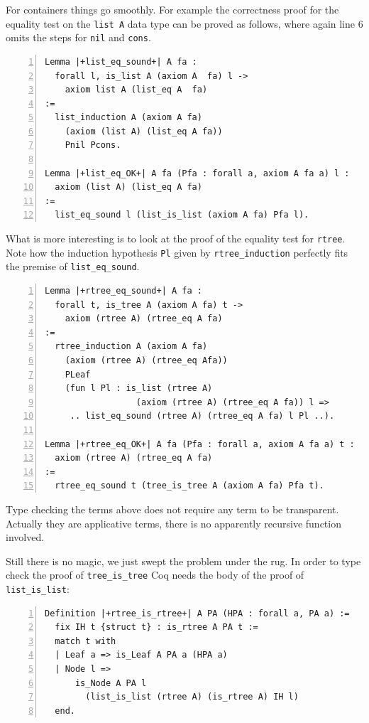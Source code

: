 \documentclass[sigplan,10pt,review]{acmart}\settopmatter{printfolios=true,printccs=false,printacmref=false}
\begin{document}
For containers things go smoothly. For example the correctness proof
for the equality test on the \lstinline+list A+ data type can be
proved as follows, where again line 6 omits the steps for
\lstinline+nil+ and \lstinline+cons+.

\begin{lstlisting}[numbers=left]
Lemma |+list_eq_sound+| A fa :
  forall l, is_list A (axiom A  fa) l ->
    axiom list A (list_eq A  fa)
:=
  list_induction A (axiom A fa)
    (axiom (list A) (list_eq A fa))
    Pnil Pcons.

Lemma |+list_eq_OK+| A fa (Pfa : forall a, axiom A fa a) l :
  axiom (list A) (list_eq A fa)
:=
  list_eq_sound l (list_is_list (axiom A fa) Pfa l).
\end{lstlisting}

\noindent
What is more interesting is to look at the proof of the equality test
for \lstinline+rtree+. Note how the induction hypothesis
\lstinline+Pl+
given by \lstinline+rtree_induction+ perfectly fits
the premise of \lstinline+list_eq_sound+.

\begin{lstlisting}[numbers=left]
Lemma |+rtree_eq_sound+| A fa :
  forall t, is_tree A (axiom A fa) t ->
    axiom (rtree A) (rtree_eq A fa)
:=
  rtree_induction A (axiom A fa)
    (axiom (rtree A) (rtree_eq Afa))
    PLeaf
    (fun l Pl : is_list (rtree A) 
                  (axiom (rtree A) (rtree_eq A fa)) l =>
     .. list_eq_sound (rtree A) (rtree_eq A fa) l Pl ..).

Lemma |+rtree_eq_OK+| A fa (Pfa : forall a, axiom A fa a) t :
  axiom (rtree A) (rtree_eq A fa)
:=
  rtree_eq_sound t (tree_is_tree A (axiom A fa) Pfa t).
\end{lstlisting}

Type checking the terms above does not require any term to be
transparent. Actually they are applicative terms, there is no
apparently recursive function involved.

Still there is no magic, we just swept the problem under the rug.
In order to type check the proof
of \lstinline+tree_is_tree+ Coq needs the body
of the proof of \lstinline+list_is_list+:

\begin{lstlisting}[numbers=left]
Definition |+rtree_is_rtree+| A PA (HPA : forall a, PA a) :=
  fix IH t {struct t} : is_rtree A PA t :=
  match t with
  | Leaf a => is_Leaf A PA a (HPA a)
  | Node l =>
      is_Node A PA l
        (list_is_list (rtree A) (is_rtree A) IH l)
  end.
\end{lstlisting}
\end{document}
